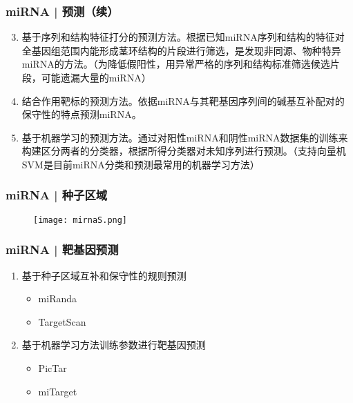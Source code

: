 \begin{frame}
  \frametitle{miRNA | \alert{预测}（续）}
  \begin{enumerate}
    \setcounter{enumi}{2}
    \item 基于序列和结构特征打分的预测方法。根据已知miRNA序列和结构的特征对全基因组范围内能形成茎环结构的片段进行筛选，是发现非同源、物种特异miRNA的方法。（为降低假阳性，用异常严格的序列和结构标准筛选候选片段，可能遗漏大量的miRNA）
    \item 结合作用靶标的预测方法。依据miRNA与其靶基因序列间的碱基互补配对的保守性的特点预测miRNA。
    \item 基于机器学习的预测方法。通过对阳性miRNA和阴性miRNA数据集的训练来构建区分两者的分类器，根据所得分类器对未知序列进行预测。（支持向量机SVM是目前miRNA分类和预测最常用的机器学习方法）
  \end{enumerate}
\end{frame}

\begin{frame}
  \frametitle{miRNA | 种子区域}
  \begin{figure}
    \centering
    \texttt{[image: mirnaS.png]}
  \end{figure}
\end{frame}

\begin{frame}
  \frametitle{miRNA | \alert{靶基因预测}}
  \begin{enumerate}
    \item 基于种子区域互补和保守性的规则预测
      \begin{itemize}
        \item miRanda
        \item TargetScan
      \end{itemize}
    \item 基于机器学习方法训练参数进行靶基因预测
      \begin{itemize}
        \item PicTar
        \item miTarget
      \end{itemize}
  \end{enumerate}
\end{frame}


